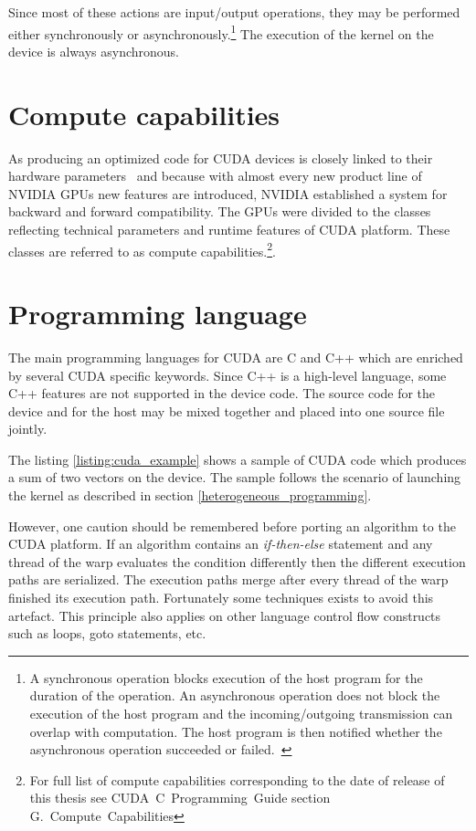 \documentclass[12pt,oneside]{fithesis2}
\begin{document}
\noindent
Since most of these actions are input/output operations, they may be performed either synchronously or asynchronously.\footnote{A synchronous operation blocks execution of the host program for the duration of the operation. An asynchronous operation does not block the execution of the host program and the incoming/outgoing transmission can overlap with computation. The host program is then notified whether the asynchronous operation succeeded or failed.~\cite{async_io}} The execution of the kernel on the device is always asynchronous.~\cite{cuda_guide}

\section{Compute capabilities}

As producing an optimized code for CUDA devices is closely linked to their hardware parameters~\cite{cuda_best_practices} and because with almost every new product line of NVIDIA GPUs new features are introduced, NVIDIA established a system for backward and forward compatibility. The GPUs were divided to the classes reflecting technical parameters and runtime features of CUDA platform. These classes are referred to as compute capabilities.\footnote{For full list of compute capabilities corresponding to the date of release of this thesis see CUDA~C~Programming~Guide \cite{cuda_guide} section G.~Compute~Capabilities}.

\section{Programming language}
\label{cuda_lang}

The main programming languages for CUDA are C and C++ which are enriched by several CUDA specific keywords. Since C++ is a high-level language, some C++ features are not supported in the device code. The source code for the device and for the host may be mixed together and placed into one source file jointly.~\cite{cuda_guide}

The listing \ref{listing:cuda_example} shows a sample of CUDA code which produces a sum of two vectors on the device. The sample follows the scenario of launching the kernel as described in section \ref{heterogeneous_programming}.

However, one caution should be remembered before porting an algorithm to the CUDA platform. If an algorithm contains an \emph{if-then-else} statement and any thread of the warp evaluates the condition differently then the different execution paths are serialized. The execution paths merge after every thread of the warp finished its execution path. Fortunately some techniques exists to avoid this artefact. This principle also applies on other language control flow constructs such as loops, goto statements, etc.~\cite{cuda_guide}
\end{document}
